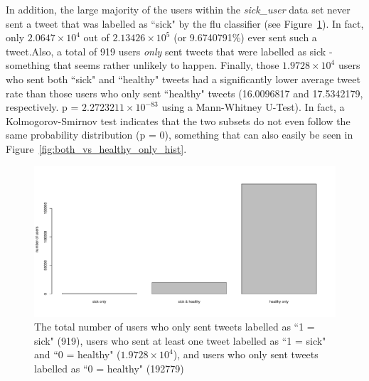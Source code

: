 \documentclass[11pt, a4paper]{report}\usepackage[]{graphicx}\usepackage[]{color}
\begin{document}
In addition, the large majority of the users within the \textit{sick\_user} data set never sent a tweet that was labelled as ``sick" by the flu classifier (see Figure~\ref{fig:barplot_sick_df}). In fact, only \ensuremath{2.0647\times 10^{4}} out of \ensuremath{2.13426\times 10^{5}} (or 9.6740791\%) ever sent such a tweet.\newline Also, a total of 919 users \textit{only} sent tweets that were labelled as sick - something that seems rather unlikely to happen. Finally, those \ensuremath{1.9728\times 10^{4}} users who sent both ``sick" and ``healthy" tweets had a significantly lower average tweet rate than those users who only sent ``healthy" tweets (16.0096817 and 17.5342179, respectively. p = \ensuremath{2.2723211\times 10^{-83}} using a Mann-Whitney U-Test). In fact, a Kolmogorov-Smirnov test indicates that the two subsets do not even follow the same probability distribution (p = 0), something that can also easily be seen in Figure~\ref{fig:both_vs_healthy_only_hist}.

\begin{figure}[h]
\centering
\includegraphics[width=1\linewidth]{barplot_sick_raw_df.pdf}
\caption{The total number of users who only sent tweets labelled as ``1 = sick" (919), users who sent at least one tweet labelled as ``1 = sick" and ``0 = healthy" (\ensuremath{1.9728\times 10^{4}}), and users who only sent tweets labelled as ``0 = healthy" (192779)}
\label{fig:barplot_sick_df}
\end{figure}
\end{document}
